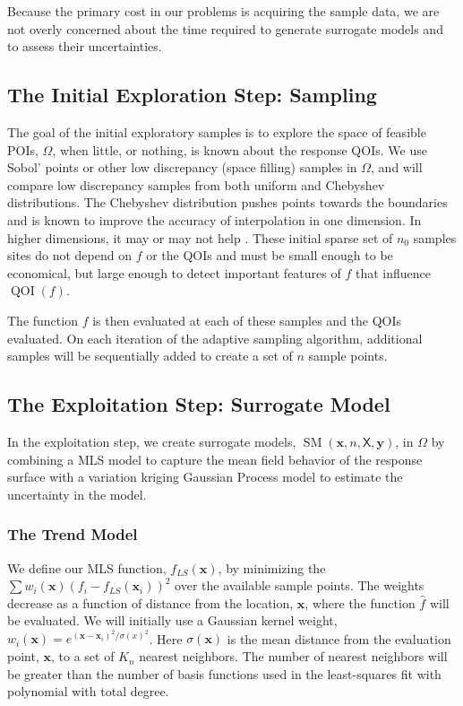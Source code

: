 \documentclass[11pt]{NSFamsart}
\DeclareMathOperator{\QOI}{QOI} %
\DeclareMathOperator{\SURR}{SM} %
\newcommand{\mX}{\mathsf{X}}
\newcommand{\bx}{{\boldsymbol{x}}}
\newcommand{\by}{{\boldsymbol{y}}}
\begin{document}
Because the primary  cost in our problems is acquiring the sample data, we are not overly concerned about the time required to generate surrogate models and to assess their uncertainties.


\subsection{The Initial Exploration Step: Sampling}

The goal of the initial exploratory samples is to explore the space of feasible POIs, $\Omega$,  when little, or nothing, is known about the response QOIs. 
 We use  Sobol' points or other low discrepancy (space filling) samples \cite{DicPil10a} in $\Omega$, 
  and  will compare low discrepancy samples from both uniform and Chebyshev distributions.
The  Chebyshev distribution pushes points towards the boundaries and is known to improve the accuracy of interpolation in one dimension.  
In higher dimensions, it may or may not help \cite{HicLi12a}.
These initial sparse set of $n_0$ samples sites do not depend on $f$ or the QOIs and must be small enough to be economical, 
but large enough to detect important features of $f$ that influence $\QOI(f)$.
 
The function $f$  is then evaluated at each of these samples and the QOIs evaluated.  
On each iteration of the adaptive sampling algorithm, additional samples will be sequentially added to create a set of $n$ sample points.

\subsection{The Exploitation Step:  Surrogate Model}

In the exploitation step, we create surrogate models, $\SURR(\bx,n,\mX,\by)$, in $\Omega$ by combining a MLS model to capture the mean field behavior of the response surface with a 
variation kriging Gaussian Process model to estimate the uncertainty in the model. 
 
\subsubsection{The Trend Model} \label{sec:trend}
We define our MLS function, $f_{LS}(\bx)$, by minimizing the $\sum w_i(\bx) (f_i - f_{LS}(\bx_i))^2$ over the available sample points.  The weights decrease as a function of distance from the location, $\bx$, where the function $\hat f$ will be evaluated.   We will initially use a Gaussian kernel weight,  $w_i(\bx) = e^{(\bx-\bx_i)^2/\sigma(x)^2}$.  
Here $\sigma(\bx)$ is the mean distance from the evaluation point, $\bx$, to a set of $K_n$ nearest neighbors.  The number of nearest neighbors will be greater than the number of basis functions used in the least-squares fit with polynomial with total degree.  
\end{document}
